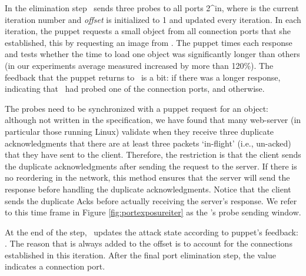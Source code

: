 \documentclass[conference]{IEEEtran}
\newcommand{\malcoman}{\mbox{}}
\newcommand{\ignore}[1]{}
\begin{document}
In the elimination step \mal\ sends three probes to all ports 2^in, where  is the current iteration number and \textit{offset} is initialized to 1 and updated every iteration. In each iteration, the puppet requests a small object from all connection ports that she established, this by requesting an image from \malcoman. The puppet times each response and tests whether the time to load one object was significantly longer than others (in our experiments average measured increased by more than 120\%). The feedback that the puppet returns to \mal\ is a bit:  if there was a longer response, indicating that \mal\ had probed one of the connection ports, and  otherwise. 

The probes need to be synchronized with a puppet request for an object: although not written in the specification, we have found that many web-server (in particular those running Linux) validate when they receive three duplicate acknowledgments that there are at least three packets `in-flight' (i.e., un-acked) that they have sent to the client. Therefore, the restriction is that the client sends the duplicate acknowledgments after sending the request to the server. If there is no reordering in the network, this method ensures that the server will send the response before handling the duplicate acknowledgments. Notice that the client sends the duplicate Acks before actually receiving the server's response. We refer to this time frame in Figure \ref{fig:portexposureiter} as the \mal's probe sending window.

At the end of the step, \mal\ updates the attack state according to puppet's feedback: . The reason that  is always added to the offset is to account for the  connections established in this iteration. After the final port elimination step, the value  indicates a connection port.

\ignore{
Each iteration eliminates half the possible ports, after  the value  is one of the ports that were allocated for the connection. This technique takes advantage on the algorithm sequential port allocation, allowing the adversary to only probe a fraction of the possible ports. Figure \ref{fig:portexposureiter} illustrates an iteration of the port exposure process.

The attacker can perform another  iterations to identify the last allocated port and the current value of the port counter used for \lin. However, in the following phases of the TCP injection attack, we only require knowledge a client port used in a connection with \lin\ and not the exact counter value.
}
\end{document}
